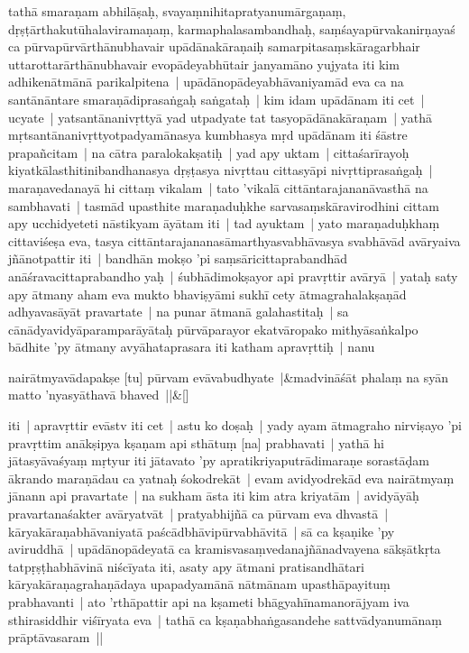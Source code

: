 \documentclass[article,12pt,a4paper]{memoir}
\begin{document}
	  \pstart tathā smaraṇam abhilāṣaḥ, svayaṃnihitapratyanumārgaṇaṃ, dṛṣṭārthakutūhalaviramaṇaṃ, karmaphalasambandhaḥ, saṃśayapūrvakanirṇayaś ca pūrvapūrvārthānubhavair upādānakāraṇaiḥ samarpitasaṃskāragarbhair uttarottarārthānubhavair evopādeyabhūtair janyamāno yujyata iti kim adhikenātmānā parikalpitena | \label{thakur75-127.13} upādānopādeyabhāvaniyamād eva ca na santānāntare smaraṇādiprasaṅgaḥ saṅgataḥ | kim idam upādānam iti cet | \label{thakur75-127.14} ucyate | yatsantānanivṛttyā yad utpadyate tat tasyopādānakāraṇam | yathā mṛtsantānanivṛttyotpadyamānasya kumbhasya mṛd upādānam iti śāstre prapañcitam | na cātra paralokakṣatiḥ | \label{thakur75-127.17} yad apy uktam | cittaśarīrayoḥ kiyatkālasthitinibandhanasya dṛṣṭasya nivṛttau cittasyāpi nivṛttiprasaṅgaḥ | maraṇavedanayā hi cittaṃ vikalam | tato 'vikalā cittāntarajananāvasthā na sambhavati | tasmād upasthite maraṇaduḥkhe sarvasaṃskāravirodhini cittam apy ucchidyeteti nāstikyam āyātam iti | \label{thakur75-127.20} tad ayuktam | yato maraṇaduḥkhaṃ cittaviśeṣa eva, tasya cittāntarajananasāmarthyasvabhāvasya svabhāvād avāryaiva jñānotpattir iti | \label{thakur75-127.22} bandhān mokṣo 'pi saṃsāricittaprabandhād anāśravacittaprabandho yaḥ | \label{thakur75-127.23} śubhādimokṣayor api pravṛttir avāryā | yataḥ saty apy ātmany aham eva mukto bhaviṣyāmi sukhī cety ātmagrahalakṣaṇād adhyavasāyāt pravartate | na punar ātmanā galahastitaḥ | sa cānādyavidyāparamparāyātaḥ pūrvāparayor ekatvāropako mithyāsaṅkalpo bādhite 'py ātmany avyāhataprasara iti katham apravṛttiḥ | \label{thakur75-127.26} nanu
	\pend
      
	    
	    \stanza[\smallbreak]
	nairātmyavādapakṣe [tu] pūrvam evāvabudhyate |&madvināśāt phalaṃ na syān matto 'nyasyāthavā bhaved ||\&[\smallbreak]


	

	  \pstart iti | apravṛttir evāstv iti cet | \label{thakur75-127.29} astu ko doṣaḥ | yady ayam ātmagraho nirviṣayo 'pi pravṛttim anākṣipya kṣaṇam api sthātuṃ [na] prabhavati | yathā hi jātasyāvaśyaṃ mṛtyur iti jātavato 'py apratikriyaputrādimaraṇe sorastāḍam ākrando maraṇādau ca yatnaḥ śokodrekāt | evam avidyodrekād eva nairātmyaṃ jānann api pravartate | na sukham āsta iti kim atra kriyatām | avidyāyāḥ pravartanaśakter avāryatvāt | \label{thakur75-128.3} pratyabhijñā ca pūrvam eva dhvastā | kāryakāraṇabhāvaniyatā paścādbhāvipūrvabhāvitā | sā ca kṣaṇike 'py aviruddhā | upādānopādeyatā ca kramisvasaṃvedanajñānadvayena sākṣātkṛta tatpṛṣṭhabhāvinā niścīyata iti, \label{thakur75-128.6} asaty apy ātmani pratisandhātari kāryakāraṇagrahaṇādaya upapadyamānā nātmānam upasthāpayituṃ prabhavanti | ato 'rthāpattir api na kṣameti bhāgyahīnamanorājyam iva sthirasiddhir viśīryata eva | \label{thakur75-121.8} tathā ca kṣaṇabhaṅgasandehe sattvādyanumānaṃ prāptāvasaram ||
	\pend
      
\end{document}
